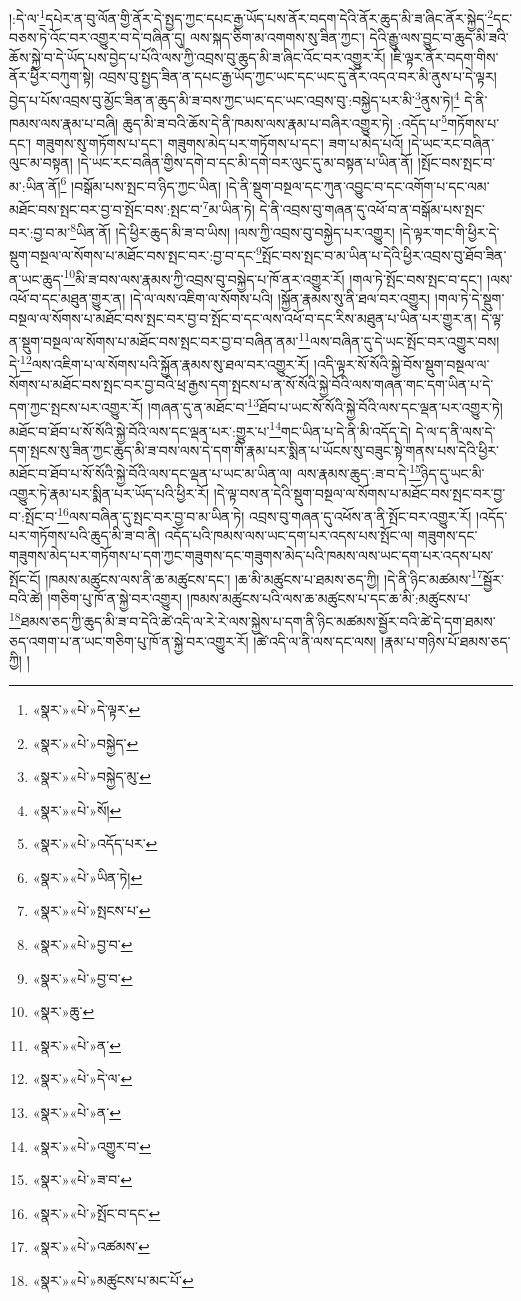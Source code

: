 །:དེ་ལ་\footnote{«སྣར་»«པེ་»དེ་ལྟར་}དཔེར་ན་བུ་ལོན་གྱི་ནོར་དེ་སྤྱད་ཀྱང་དཔང་རྒྱ་ཡོད་པས་ནོར་བདག་དེའི་ནོར་ཆུད་མི་ཟ་ཞིང་ནོར་སྐྱེད་\footnote{«སྣར་»«པེ་»བསྐྱེད་}དང་བཅས་ཏེ་འོང་བར་འགྱུར་བ་དེ་བཞིན་དུ། ལས་སྐད་ཅིག་མ་འགགས་སུ་ཟིན་ཀྱང་། དེའི་རྒྱུ་ལས་བྱུང་བ་ཆུད་མི་ཟའི་ཆོས་སྐྱེ་བ་དེ་ཡོད་པས་བྱེད་པ་པོའི་ལས་ཀྱི་འབྲས་བུ་ཆུད་མི་ཟ་ཞིང་འོང་བར་འགྱུར་རོ། །ཇི་ལྟར་ནོར་བདག་གིས་ནོར་ཕྱིར་བཀུག་སྟེ། འབྲས་བུ་སྤྱད་ཟིན་ན་དཔང་རྒྱ་ཡོད་ཀྱང་ཡང་དང་ཡང་དུ་ནོར་འདའ་བར་མི་ནུས་པ་དེ་ལྟར། བྱེད་པ་པོས་འབྲས་བུ་མྱོང་ཟིན་ན་ཆུད་མི་ཟ་བས་ཀྱང་ཡང་དང་ཡང་འབྲས་བུ་:བསྐྱེད་པར་མི་\footnote{«སྣར་»«པེ་»བསྐྱེད་མུ་}ནུས་ཏེ།\footnote{«སྣར་»«པེ་»སོ།} དེ་ནི་ཁམས་ལས་རྣམ་པ་བཞི། ཆུད་མི་ཟ་བའི་ཆོས་དེ་ནི་ཁམས་ལས་རྣམ་པ་བཞིར་འགྱུར་ཏེ། :འདོད་པ་\footnote{«སྣར་»«པེ་»འདོད་པར་}གཏོགས་པ་དང་། གཟུགས་སུ་གཏོགས་པ་དང་། གཟུགས་མེད་པར་གཏོགས་པ་དང་། ཟག་པ་མེད་པའོ། །དེ་ཡང་རང་བཞིན་ལུང་མ་བསྟན། །དེ་ཡང་རང་བཞིན་གྱིས་དགེ་བ་དང་མི་དགེ་བར་ལུང་དུ་མ་བསྟན་པ་ཡིན་ནོ། །སྤོང་བས་སྤང་བ་མ་:ཡིན་ནོ།\footnote{«སྣར་»«པེ་»ཡིན་ཏེ།} །བསྒོམ་པས་སྤང་བ་ཉིད་ཀྱང་ཡིན། །དེ་ནི་སྡུག་བསྔལ་དང་ཀུན་འབྱུང་བ་དང་འགོག་པ་དང་ལམ་མཐོང་བས་སྤང་བར་བྱ་བ་སྤོང་བས་:སྤང་བ་\footnote{«སྣར་»«པེ་»སྤངས་པ་}མ་ཡིན་ཏེ། དེ་ནི་འབྲས་བུ་གཞན་དུ་འཕོ་བ་ན་བསྒོམ་པས་སྤང་བར་:བྱ་བ་མ་\footnote{«སྣར་»«པེ་»བྱ་བ་}ཡིན་ནོ། །དེ་ཕྱིར་ཆུད་མི་ཟ་བ་ཡིས། །ལས་ཀྱི་འབྲས་བུ་བསྐྱེད་པར་འགྱུར། །དེ་ལྟར་གང་གི་ཕྱིར་དེ་སྡུག་བསྔལ་ལ་སོགས་པ་མཐོང་བས་སྤང་བར་:བྱ་བ་དང་\footnote{«སྣར་»«པེ་»བྱ་བ་}སྤོང་བས་སྤང་བ་མ་ཡིན་པ་དེའི་ཕྱིར་འབྲས་བུ་ཐོབ་ཟིན་ན་ཡང་ཆུད་\footnote{«སྣར་»ཆུ་}མི་ཟ་བས་ལས་རྣམས་ཀྱི་འབྲས་བུ་བསྐྱེད་པ་ཁོ་ནར་འགྱུར་རོ། །གལ་ཏེ་སྤོང་བས་སྤང་བ་དང་། །ལས་འཕོ་བ་དང་མཐུན་གྱུར་ན། །དེ་ལ་ལས་འཇིག་ལ་སོགས་པའི། །སྐྱོན་རྣམས་སུ་ནི་ཐལ་བར་འགྱུར། །གལ་ཏེ་དེ་སྡུག་བསྔལ་ལ་སོགས་པ་མཐོང་བས་སྤང་བར་བྱ་བ་སྤོང་བ་དང་ལས་འཕོ་བ་དང་རིས་མཐུན་པ་ཡིན་པར་གྱུར་ན། དེ་ལྟ་ན་སྡུག་བསྔལ་ལ་སོགས་པ་མཐོང་བས་སྤང་བར་བྱ་བ་བཞིན་ནམ་\footnote{«སྣར་»«པེ་»ན་}ལས་བཞིན་དུ་དེ་ཡང་སྤོང་བར་འགྱུར་བས། དེ་\footnote{«སྣར་»«པེ་»དེ་ལ་}ལས་འཇིག་པ་ལ་སོགས་པའི་སྐྱོན་རྣམས་སུ་ཐལ་བར་འགྱུར་རོ། །འདི་ལྟར་སོ་སོའི་སྐྱེ་བོས་སྡུག་བསྔལ་ལ་སོགས་པ་མཐོང་བས་སྤང་བར་བྱ་བའི་ཕྲ་རྒྱས་དག་སྤངས་པ་ན་སོ་སོའི་སྐྱེ་བོའི་ལས་གཞན་གང་དག་ཡིན་པ་དེ་དག་ཀྱང་སྤངས་པར་འགྱུར་རོ། །གཞན་དུ་ན་མཐོང་བ་\footnote{«སྣར་»«པེ་»ན་}ཐོབ་པ་ཡང་སོ་སོའི་སྐྱེ་བོའི་ལས་དང་ལྡན་པར་འགྱུར་ཏེ། མཐོང་བ་ཐོབ་པ་སོ་སོའི་སྐྱེ་བོའི་ལས་དང་ལྡན་པར་:གྱུར་པ་\footnote{«སྣར་»«པེ་»འགྱུར་བ་}གང་ཡིན་པ་དེ་ནི་མི་འདོད་དེ། དེ་ལ་ད་ནི་ལས་དེ་དག་སྤངས་སུ་ཟིན་ཀྱང་ཆུད་མི་ཟ་བས་ལས་དེ་དག་གི་རྣམ་པར་སྨིན་པ་ཡོངས་སུ་བཟུང་སྟེ་གནས་པས་དེའི་ཕྱིར་མཐོང་བ་ཐོབ་པ་སོ་སོའི་སྐྱེ་བོའི་ལས་དང་ལྡན་པ་ཡང་མ་ཡིན་ལ། ལས་རྣམས་ཆུད་:ཟ་བ་དེ་\footnote{«སྣར་»«པེ་»ཟ་བ་}ཉིད་དུ་ཡང་མི་འགྱུར་ཏེ་རྣམ་པར་སྨིན་པར་ཡོད་པའི་ཕྱིར་རོ། །དེ་ལྟ་བས་ན་དེའི་སྡུག་བསྔལ་ལ་སོགས་པ་མཐོང་བས་སྤང་བར་བྱ་བ་:སྤོང་བ་\footnote{«སྣར་»«པེ་»སྤོང་བ་དང་}ལས་བཞིན་དུ་སྤང་བར་བྱ་བ་མ་ཡིན་ཏེ། འབྲས་བུ་གཞན་དུ་འཕོས་ན་ནི་སྤོང་བར་འགྱུར་རོ། །འདོད་པར་གཏོགས་པའི་ཆུད་མི་ཟ་བ་ནི། འདོད་པའི་ཁམས་ལས་ཡང་དག་པར་འདས་པས་སྤོང་ལ། གཟུགས་དང་གཟུགས་མེད་པར་གཏོགས་པ་དག་ཀྱང་གཟུགས་དང་གཟུགས་མེད་པའི་ཁམས་ལས་ཡང་དག་པར་འདས་པས་སྤོང་ངོ། །ཁམས་མཚུངས་ལས་ནི་ཆ་མཚུངས་དང་། །ཆ་མི་མཚུངས་པ་ཐམས་ཅད་ཀྱི། །དེ་ནི་ཉིང་མཚམས་\footnote{«སྣར་»«པེ་»འཚམས་}སྦྱོར་བའི་ཚེ། །གཅིག་པུ་ཁོ་ན་སྐྱེ་བར་འགྱུར། །ཁམས་མཚུངས་པའི་ལས་ཆ་མཚུངས་པ་དང་ཆ་མི་:མཚུངས་པ་\footnote{«སྣར་»«པེ་»མཚུངས་པ་མང་པོ་}ཐམས་ཅད་ཀྱི་ཆུད་མི་ཟ་བ་དེའི་ཚེ་འདི་ལ་རེ་རེ་ལས་སྐྱེས་པ་དག་ནི་ཉིང་མཚམས་སྦྱོར་བའི་ཚེ་དེ་དག་ཐམས་ཅད་འགག་པ་ན་ཡང་གཅིག་པུ་ཁོ་ན་སྐྱེ་བར་འགྱུར་རོ། །ཚེ་འདི་ལ་ནི་ལས་དང་ལས། །རྣམ་པ་གཉིས་པོ་ཐམས་ཅད་ཀྱི། །
